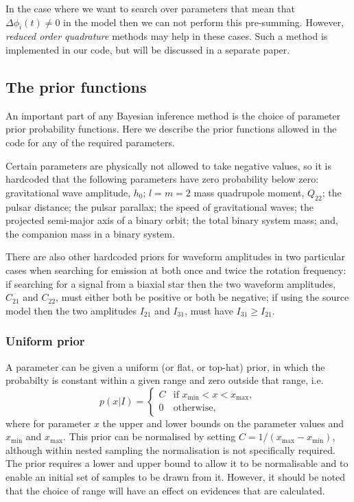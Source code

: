 In the case where we want to search over parameters that mean that $\Delta\phi_i(t) \ne 0$ in the model then
we can not perform this pre-summing. However, {\it reduced order quadrature} methods
\citep[e.g.][]{2014PhRvX...4c1006F, 2015PhRvL.114g1104C} may help in these cases. Such a method is implemented in our
code, but will be discussed in a separate paper.

\subsection{The prior functions}\label{sec:priorfuncs}

An important part of any Bayesian inference method is the choice of parameter prior probability functions. Here we describe the prior
functions allowed in the code for any of the required parameters.

Certain parameters are physically not allowed to take negative values, so it is hardcoded that the following parameters
have zero probability below zero: gravitational wave amplitude, $h_0$; $l=m=2$ mass quadrupole moment, $Q_{22}$; the pulsar
distance; the pulsar parallax; the speed of gravitational waves; the projected semi-major axis of a binary orbit; the total
binary system mass; and, the companion mass in a binary system.

There are also other hardcoded priors for waveform amplitudes in two particular cases when searching for emission at both once
and twice the rotation frequency: if searching for a signal from a biaxial star then the two waveform amplitudes, $C_{21}$ and $C_{22}$,
must either both be positive or both be negative; if using the source model then the two amplitudes $I_{21}$ and $I_{31}$, must
have $I_{31} \geqslant I_{21}$.

\subsubsection{Uniform prior}\label{sec:uniformprior}

A parameter can be given a uniform (or flat, or top-hat) prior, in which the probabilty is constant within a given
range and zero outside that range, i.e.
\begin{equation}
p(x|I) = \begin{cases}
             C & \text{if } x_{\text{min}} < x < x_{\text{max}}, \\
             0 & \text{otherwise},
            \end{cases}
\end{equation}
where for parameter $x$ the upper and lower bounds on the parameter values and $x_{\text{min}}$ and $x_{\text{max}}$. This
prior can be normalised by setting $C = 1/(x_{\text{max}}-x_{\text{min}})$, although within nested sampling the normalisation
is not specifically required. The prior requires a lower and upper bound to allow it to be normalisable and to enable
an initial set of samples to be drawn from it. However, it should be noted that the choice of range will have an
effect on evidences that are calculated.

